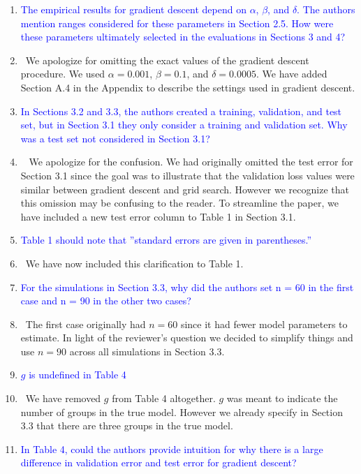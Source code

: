 \documentclass[]{article}
\newcommand{\point}[1]{\item \textcolor{blue}{#1}}
\newcommand{\reply}{\item[]\ }
\begin{document}
\begin{enumerate}
		\point{The empirical results for gradient descent depend on $\alpha$, $\beta$, and $\delta$. The authors mention ranges considered for these parameters in Section 2.5. How were these parameters ultimately selected in the evaluations in Sections 3 and 4?}
		
		\reply We apologize for omitting the exact values of the gradient descent procedure. We used $\alpha = 0.001$, $\beta = 0.1$, and $\delta = 0.0005$. We have added Section A.4 in the Appendix to describe the settings used in gradient descent.
		
		\point{In Sections 3.2 and 3.3, the authors created a training, validation, and test set, but in Section 3.1 they only consider a training and validation set. Why was a test set not considered in Section 3.1?}
		
		\reply 
		We apologize for the confusion. We had originally omitted the test error for Section 3.1 since the goal was to illustrate that the validation loss values were similar between gradient descent and grid search. However we recognize that this omission may be confusing to the reader. To streamline the paper, we have included a new test error column to Table 1 in Section 3.1.
		
		\point{Table 1 should note that ”standard errors are given in parentheses.”}
		
		\reply We have now included this clarification to Table 1.
		
		\point{For the simulations in Section 3.3, why did the authors set n = 60 in the first case and
n = 90 in the other two cases?}
		
		\reply The first case originally had $n = 60$ since it had fewer model parameters to estimate. In light of the reviewer's question we decided to simplify things and use $n = 90$ across all simulations in Section 3.3.
		
		\point{$g$ is undefined in Table 4}
		
		\reply We have removed $g$ from Table 4 altogether. $g$ was meant to indicate the number of groups in the true model. However we already specify in Section 3.3 that there are three groups in the true model.
		
		\point{In Table 4, could the authors provide intuition for why there is a large difference in validation error and test error for gradient descent?}
		

\end{enumerate}
\end{document}
